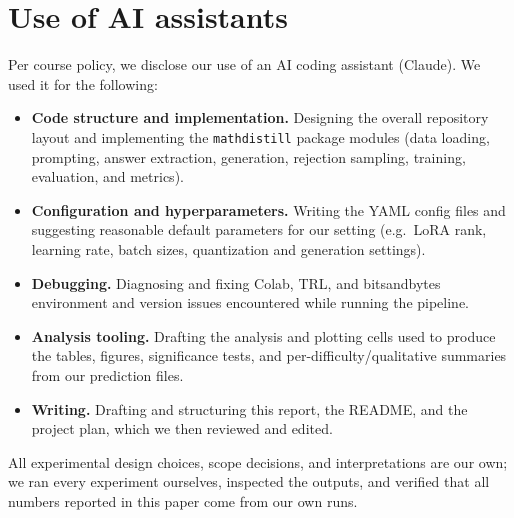 \documentclass[11pt]{article}
\begin{document}
\section{Use of AI assistants}
Per course policy, we disclose our use of an AI coding assistant (Claude). We used
it for the following:
\begin{itemize}
  \item \textbf{Code structure and implementation.} Designing the overall
  repository layout and implementing the \texttt{mathdistill} package modules
  (data loading, prompting, answer extraction, generation, rejection sampling,
  training, evaluation, and metrics).
  \item \textbf{Configuration and hyperparameters.} Writing the YAML config files
  and suggesting reasonable default parameters for our setting (e.g.\ LoRA rank,
  learning rate, batch sizes, quantization and generation settings).
  \item \textbf{Debugging.} Diagnosing and fixing Colab, TRL, and bitsandbytes
  environment and version issues encountered while running the pipeline.
  \item \textbf{Analysis tooling.} Drafting the analysis and plotting cells used to
  produce the tables, figures, significance tests, and per-difficulty/qualitative
  summaries from our prediction files.
  \item \textbf{Writing.} Drafting and structuring this report, the README, and the
  project plan, which we then reviewed and edited.
\end{itemize}
All experimental design choices, scope decisions, and interpretations are our own;
we ran every experiment ourselves, inspected the outputs, and verified that all
numbers reported in this paper come from our own runs.
\end{document}
